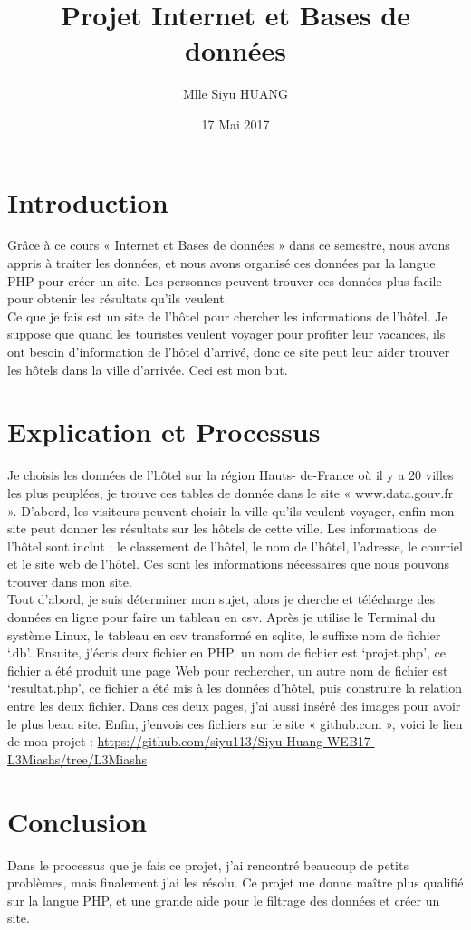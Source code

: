 \documentclass[a4paper, 12pt]{article}
\author{Mlle Siyu HUANG}
\title{Projet Internet et Bases de données}
\date{17 Mai 2017}
\begin{document}
\pagestyle{empty}
\maketitle
\pagebreak


\tableofcontents
\pagebreak

\section{Introduction}

Grâce à ce cours « Internet et Bases de données » dans ce semestre, nous avons appris à traiter les données, et nous avons organisé ces données par la langue PHP pour créer un site. Les personnes peuvent trouver ces données plus facile pour obtenir les résultats qu’ils veulent.\\

Ce que je fais est un site de l’hôtel pour chercher les informations de l’hôtel. Je suppose que quand les touristes veulent voyager pour profiter leur vacances, ils ont besoin d’information de l’hôtel d’arrivé, donc ce site peut leur aider trouver les hôtels dans la ville d’arrivée. Ceci est mon but.\\

\section{Explication et Processus}

Je choisis les données de l’hôtel sur la région Hauts- de-France où il y a 20 villes les plus peuplées, je trouve ces tables de donnée dans le site « www.data.gouv.fr ». D’abord, les visiteurs peuvent choisir la ville qu’ils veulent voyager, enfin mon site peut donner les résultats sur les hôtels de cette ville. Les informations de l’hôtel sont inclut : le classement de l’hôtel, le nom de l’hôtel, l’adresse, le courriel et le site web de l’hôtel. Ces sont les informations nécessaires que nous pouvons trouver dans mon site.\\

Tout d’abord, je suis déterminer mon sujet, alors je cherche et télécharge des données en ligne pour faire un tableau en csv. Après je utilise le Terminal du système Linux, le tableau en csv transformé en sqlite, le suffixe nom de fichier ‘.db’. Ensuite, j’écris deux fichier en PHP, un nom de fichier est ‘projet.php’, ce fichier a été produit une page Web pour rechercher, un autre nom de fichier est ‘resultat.php’, ce fichier a été mis à les données d’hôtel, puis construire la relation entre les deux fichier. Dans ces deux pages, j’ai aussi inséré des images pour avoir le plus beau site. Enfin, j’envois ces fichiers sur le site « github.com », voici le lien de mon projet :
\url{https://github.com/siyu113/Siyu-Huang-WEB17-L3Miashs/tree/L3Miashs} \\

\section{Conclusion}

Dans le processus que je fais ce projet, j’ai rencontré beaucoup de petits problèmes, mais finalement j’ai les résolu. Ce projet me donne maître plus qualifié sur la langue PHP, et une grande aide pour le filtrage des données et créer un site.\\
\end{document}
